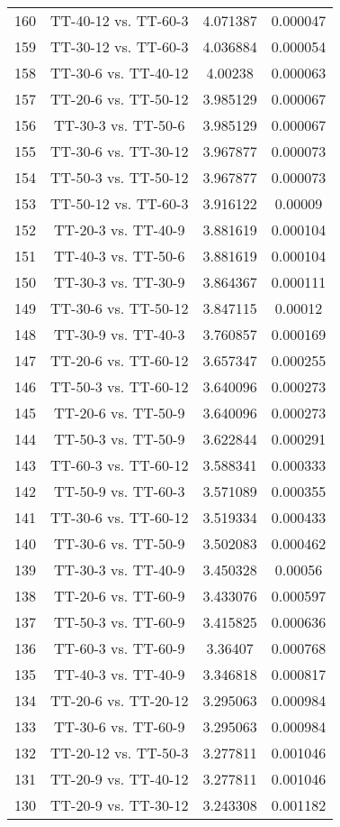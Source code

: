 \documentclass[a4paper,10pt]{article}
\begin{document}
\begin{landscape}
\begin{table}[!htp]
\begin{tabular}{cccc}
160&TT-40-12 vs. TT-60-3&4.071387&0.000047\\
159&TT-30-12 vs. TT-60-3&4.036884&0.000054\\
158&TT-30-6 vs. TT-40-12&4.00238&0.000063\\
157&TT-20-6 vs. TT-50-12&3.985129&0.000067\\
156&TT-30-3 vs. TT-50-6&3.985129&0.000067\\
155&TT-30-6 vs. TT-30-12&3.967877&0.000073\\
154&TT-50-3 vs. TT-50-12&3.967877&0.000073\\
153&TT-50-12 vs. TT-60-3&3.916122&0.00009\\
152&TT-20-3 vs. TT-40-9&3.881619&0.000104\\
151&TT-40-3 vs. TT-50-6&3.881619&0.000104\\
150&TT-30-3 vs. TT-30-9&3.864367&0.000111\\
149&TT-30-6 vs. TT-50-12&3.847115&0.00012\\
148&TT-30-9 vs. TT-40-3&3.760857&0.000169\\
147&TT-20-6 vs. TT-60-12&3.657347&0.000255\\
146&TT-50-3 vs. TT-60-12&3.640096&0.000273\\
145&TT-20-6 vs. TT-50-9&3.640096&0.000273\\
144&TT-50-3 vs. TT-50-9&3.622844&0.000291\\
143&TT-60-3 vs. TT-60-12&3.588341&0.000333\\
142&TT-50-9 vs. TT-60-3&3.571089&0.000355\\
141&TT-30-6 vs. TT-60-12&3.519334&0.000433\\
140&TT-30-6 vs. TT-50-9&3.502083&0.000462\\
139&TT-30-3 vs. TT-40-9&3.450328&0.00056\\
138&TT-20-6 vs. TT-60-9&3.433076&0.000597\\
137&TT-50-3 vs. TT-60-9&3.415825&0.000636\\
136&TT-60-3 vs. TT-60-9&3.36407&0.000768\\
135&TT-40-3 vs. TT-40-9&3.346818&0.000817\\
134&TT-20-6 vs. TT-20-12&3.295063&0.000984\\
133&TT-30-6 vs. TT-60-9&3.295063&0.000984\\
132&TT-20-12 vs. TT-50-3&3.277811&0.001046\\
131&TT-20-9 vs. TT-40-12&3.277811&0.001046\\
130&TT-20-9 vs. TT-30-12&3.243308&0.001182\\

\end{tabular}
\end{table}
\end{landscape}
\end{document}
